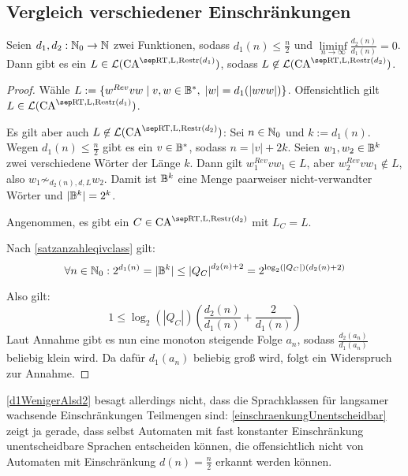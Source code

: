 \subsection{Vergleich verschiedener Einschränkungen}

\begin{satz}
    \label{d1WenigerAlsd2}
    Seien $d_1, d_2: \mathbb{N}_0 \to \mathbb{N}$ zwei Funktionen, sodass $d_1(n) \leq \frac{n}{2}$ und $\liminf\limits_{n \rightarrow \infty} \frac{d_2(n)}{d_1(n)} = 0$.
    Dann gibt es ein $L \in \CAL{\CART, \CALeft, \CARestr(d_1)}$, sodass $L \not\in \CAL{\CART, \CALeft, \CARestr(d_2)}$.
\end{satz}
\begin{proof}
    Wähle $L := \{ { w^{Rev}vw } \; | \; { v, w \in \mathbb{B}^*, \; |w| = d_1(|wvw|) } \}$. Offensichtlich gilt $L \in \CAL{\CART, \CALeft, \CARestr(d_1)}$.
    
    Es gilt aber auch $L \not\in \CAL{\CART, \CALeft, \CARestr(d_2)}$:
    Sei $n \in \mathbb{N}_0$ und $k := d_1(n)$. Wegen $d_1(n) \leq \frac{n}{2}$ gibt es ein $v \in \mathbb{B}^*$, sodass $n = |v| + 2k$.
    Seien $w_1, w_2 \in \mathbb{B}^k$ zwei verschiedene Wörter der Länge $k$.
    Dann gilt $w_1^{Rev}vw_1 \in L$, aber $w_2^{Rev}vw_1 \not\in L$, also $w_1 \not\sim_{d_2(n),d,L} w_2$.
    Damit ist $\mathbb{B}^k$ eine Menge paarweiser nicht-verwandter Wörter und $|\mathbb{B}^k| = 2^k$.
    
    Angenommen, es gibt ein $C \in \CAM{\CART, \CALeft, \CARestr(d_2)}$ mit $L_C = L$.
    
    Nach \cref{satzanzahleqivclass} gilt:
    \[
        \forall n \in \mathbb{N}_0:  2^{d_1(n)} = |\mathbb{B}^k| \leq {|Q_C|}^{d_2(n)+2} = 2^{\log_2(|Q_C|)(d_2(n)+2)}
    \]
    
    Also gilt: 
    \[
        1 \leq \log_2(|Q_C|) ( \frac{ d_2(n) }{ d_1(n) } + \frac{ 2 }{ d_1(n) })
    \]
    Laut Annahme gibt es nun eine monoton steigende Folge $a_n$, sodass $\frac{d_2(a_n)}{d_1(a_n)}$ beliebig klein wird.
    Da dafür $d_1(a_n)$ beliebig groß wird, folgt ein Widerspruch zur Annahme.
\end{proof}

\begin{remark}
    \cref{d1WenigerAlsd2} besagt allerdings nicht, dass die Sprachklassen für langsamer wachsende Einschränkungen Teilmengen sind:
    \cref{einschraenkungUnentscheidbar} zeigt ja gerade, dass selbst Automaten mit fast konstanter Einschränkung
    unentscheidbare Sprachen entscheiden können, die offensichtlich nicht von Automaten mit Einschränkung $d(n) = \frac{n}{2}$ erkannt werden können.
\end{remark}

